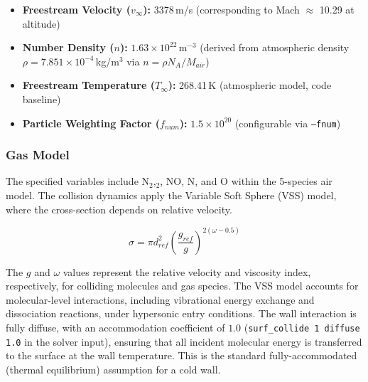 \begin{itemize}
    \item \textbf{Freestream Velocity ($v_{\infty}$):} 3378\,m/s (corresponding to Mach $\approx$ 10.29 at altitude)

    \item \textbf{Number Density ($n$):} $1.63 \times 10^{22}$\,m$^{-3}$ (derived from atmospheric density $\rho = 7.851 \times 10^{-4}$\,kg/m$^3$ via $n = \rho N_A / M_{air}$)

    \item \textbf{Freestream Temperature ($T_{\infty}$):} 268.41\,K (atmospheric model, code baseline)

    \item \textbf{Particle Weighting Factor ($f_{num}$):} $1.5 \times 10^{20}$ (configurable via \texttt{--fnum})
\end{itemize}

\subsubsection*{Gas Model}
The specified variables include N$_2$,$_2$, NO, N, and O within the 5-species air model. The collision dynamics apply the Variable Soft Sphere (VSS) model, where the cross-section depends on relative velocity.

\begin{equation}
    \sigma = \pi d_{ref}^2 \left( \frac{g_{ref}}{g} \right)^{2(\omega - 0.5)}
\end{equation}

The $g$ and $\omega$ values represent the relative velocity and viscosity index, respectively, for colliding molecules and gas species. The VSS model accounts for molecular-level interactions, including vibrational energy exchange and dissociation reactions, under hypersonic entry conditions. The wall interaction is fully diffuse, with an accommodation coefficient of $1.0$ (\texttt{surf\_collide 1 diffuse 1.0} in the solver input), ensuring that all incident molecular energy is transferred to the surface at the wall temperature. This is the standard fully-accommodated (thermal equilibrium) assumption for a cold wall.

